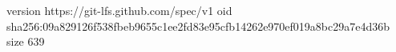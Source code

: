 version https://git-lfs.github.com/spec/v1
oid sha256:09a829126f538fbeb9655c1ee2fd83e95cfb14262e970ef019a8bc29a7e4d36b
size 639

